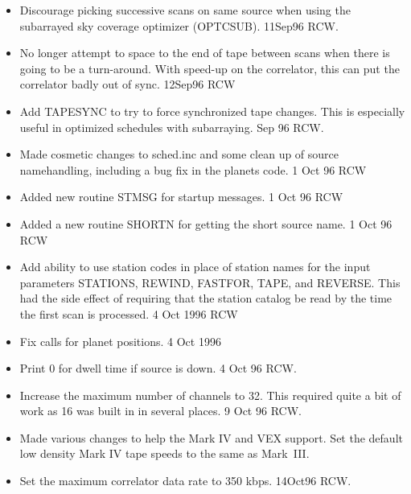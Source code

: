 \documentclass{report}
\begin{document}
\begin{itemize}

\item Discourage picking successive scans on same source when using the
      subarrayed sky coverage optimizer (OPTCSUB).  11Sep96 RCW.

\item No longer attempt to space to the end of tape between scans
      when there is going to be a turn-around.  With speed-up on
      the correlator, this can put the correlator badly out of sync.
      12Sep96  RCW

\item Add TAPESYNC to try to force synchronized tape changes.  This
      is especially useful in optimized schedules with subarraying.
      Sep 96 RCW.

\item Made cosmetic changes to sched.inc and some clean up of source
      namehandling, including a bug fix in the planets code.
      1 Oct 96 RCW

\item Added new routine STMSG for startup messages.  1 Oct 96 RCW

\item Added a new routine SHORTN for getting the short source name.
      1 Oct 96 RCW

\item Add ability to use station codes in place of station names
      for the input parameters STATIONS, REWIND, FASTFOR, TAPE, and
      REVERSE.  This had the side effect of requiring that the
      station catalog be read by the time the first scan is
      processed.   4 Oct 1996 RCW

\item Fix calls for planet positions. 4 Oct 1996

\item Print 0 for dwell time if source is down.  4 Oct 96 RCW.

\item Increase the maximum number of channels to 32.  This required
      quite a bit of work as 16 was built in in several places.
      9 Oct 96  RCW.

\item Made various changes to help the Mark IV and VEX support.
      Set the default low density Mark IV tape speeds to the
      same as Mark~III.

\item Set the maximum correlator data rate to 350 kbps.  14Oct96 RCW.


\end{itemize}
\end{document}
